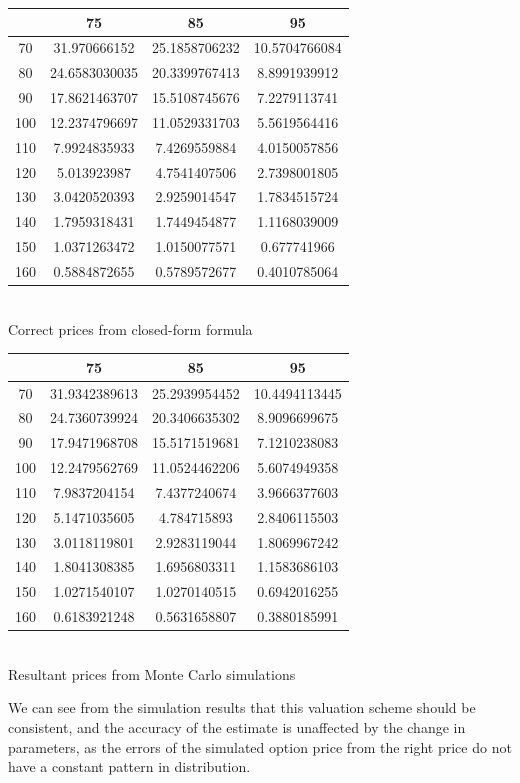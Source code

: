 \begin{center}
\begin{tabular}{|c|c|c|c|}
\hline 
 & 75 & 85 & 95\\
\hline
70&31.970666152&25.1858706232&10.5704766084\\
80&24.6583030035&20.3399767413&8.8991939912\\
90&17.8621463707&15.5108745676&7.2279113741\\
100&12.2374796697&11.0529331703&5.5619564416\\
110&7.9924835933&7.4269559884&4.0150057856\\
120&5.013923987&4.7541407506&2.7398001805\\
130&3.0420520393&2.9259014547&1.7834515724\\
140&1.7959318431&1.7449454877&1.1168039009\\
150&1.0371263472&1.0150077571&0.677741966\\
160&0.5884872655&0.5789572677&0.4010785064\\
\hline
\end{tabular}
\\[1mm]Correct prices from closed-form formula
\\[3mm]
\begin{tabular}{|c|c|c|c|}
\hline
 & 75 & 85 & 95\\
\hline
70&31.9342389613&25.2939954452&10.4494113445\\
80&24.7360739924&20.3406635302&8.9096699675\\
90&17.9471968708&15.5171519681&7.1210238083\\
100&12.2479562769&11.0524462206&5.6074949358\\
110&7.9837204154&7.4377240674&3.9666377603\\
120&5.1471035605&4.784715893&2.8406115503\\
130&3.0118119801&2.9283119044&1.8069967242\\
140&1.8041308385&1.6956803311&1.1583686103\\
150&1.0271540107&1.0270140515&0.6942016255\\
160&0.6183921248&0.5631658807&0.3880185991\\
\hline
\end{tabular}
\\[1mm] Resultant prices from Monte Carlo simulations
\end{center}
We can see from the simulation results that this valuation scheme should be consistent, and the accuracy of the estimate is unaffected by the change in parameters, as the errors of the simulated option price from the right price do not have a constant pattern in distribution.
\newpage

